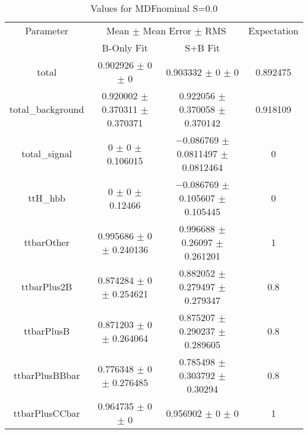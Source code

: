 \begin{table}
\centering
\caption{Values for MDFnominal S=0.0}
\begin{tabular}{cccc}
\toprule
Parameter & \multicolumn{2}{c}{Mean $\pm$ Mean Error $\pm$ RMS} & Expectation\\
 & B-Only Fit & S+B Fit & \\
\midrule
total & \num{0.902926} $\pm$ \num{0} $\pm$ \num{0} & \num{0.903332} $\pm$ \num{0} $\pm$ \num{0} & \num{0.892475}\\
total\_background & \num{0.920002} $\pm$ \num{0.370311} $\pm$ \num{0.370371} & \num{0.922056} $\pm$ \num{0.370058} $\pm$ \num{0.370142} & \num{0.918109}\\
total\_signal & \num{0} $\pm$ \num{0} $\pm$ \num{0.106015} & \num{-0.086769} $\pm$ \num{0.0811497} $\pm$ \num{0.0812464} & \num{0}\\
ttH\_hbb & \num{0} $\pm$ \num{0} $\pm$ \num{0.12466} & \num{-0.086769} $\pm$ \num{0.105607} $\pm$ \num{0.105445} & \num{0}\\
ttbarOther & \num{0.995686} $\pm$ \num{0} $\pm$ \num{0.240136} & \num{0.996688} $\pm$ \num{0.26097} $\pm$ \num{0.261201} & \num{1}\\
ttbarPlus2B & \num{0.874284} $\pm$ \num{0} $\pm$ \num{0.254621} & \num{0.882052} $\pm$ \num{0.279497} $\pm$ \num{0.279347} & \num{0.8}\\
ttbarPlusB & \num{0.871203} $\pm$ \num{0} $\pm$ \num{0.264064} & \num{0.875207} $\pm$ \num{0.290237} $\pm$ \num{0.289605} & \num{0.8}\\
ttbarPlusBBbar & \num{0.776348} $\pm$ \num{0} $\pm$ \num{0.276485} & \num{0.785498} $\pm$ \num{0.303792} $\pm$ \num{0.30294} & \num{0.8}\\
ttbarPlusCCbar & \num{0.964735} $\pm$ \num{0} $\pm$ \num{0} & \num{0.956902} $\pm$ \num{0} $\pm$ \num{0} & \num{1}\\
\bottomrule
\end{tabular}
\end{table}